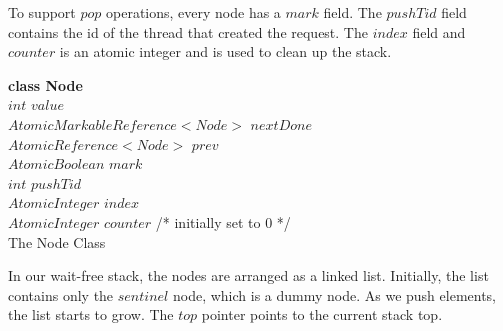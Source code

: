 \documentclass{llncs}
\begin{document}
 To support $pop$ operations, every node has a $mark$ field. The $pushTid$ field contains 
the id of the thread that created the request. The $index$ field and $counter$ is an atomic integer and is used 
to clean up the stack.
\vspace{-6mm}
\begin{algorithm}
\scriptsize
\SetAlgoLined
\textbf{class Node}{}\\
		\hspace{5mm}$int$ $value$\\
		\hspace{5mm}$AtomicMarkableReference<Node>$ $nextDone$\\
		\hspace{5mm}$AtomicReference<Node>$ $prev$\\
		\hspace{5mm}$AtomicBoolean$ $mark$\\
		\hspace{5mm}$int$ $pushTid$\\
		\hspace{5mm}$AtomicInteger$ $index$\\	
		\hspace{5mm}$AtomicInteger$ $counter$  /* initially set to 0 */\\ 	
\caption{The Node Class} \label{alg:node}
\end{algorithm}
\vspace{-6mm}


\begin{comment}
\begin{figure}[!htb]
\begin{center}
\texttt{[image: list]}
\caption{The underlying data structure of the stack with $top$ and $sentinel$ nodes \label{fig:wfstack}}
\end{center}
\end{figure}
\end{comment}
In our wait-free stack, the nodes are arranged as a linked list. Initially, the list contains 
only the $sentinel$ node, which is a dummy node. As we push elements, the list starts to grow. 
The $top$ pointer points to the current stack top. 


\begin{comment}
\begin{algorithm}
\scriptsize
$AtomicReference<Node>$ $top$\\
$Node$ $sentinel$ \\

\textbf{WFstack}() \{ \\
	\hspace{5mm}$sentinel$ $\leftarrow$  $new Node(-1,-1)$\\
	\hspace{5mm}$top$ $\leftarrow$ $new$ $AtomicReference<Node>(sentinel)$\\
	.... \\
\}
\caption{Class WFStack \label{alg:wfs}}
\end{algorithm}
\end{comment}
\end{document}
